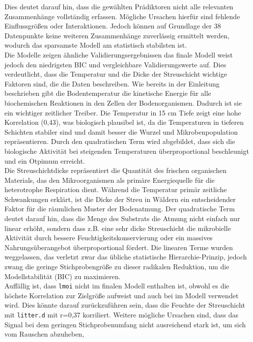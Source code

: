 Dies deutet darauf hin, dass die gewählten Prädiktoren nicht alle relevanten Zusammenhänge vollständig erfassen. Mögliche Ursachen hierfür sind fehlende
Einflussgrößen oder Interaktionen. Jedoch können auf Grundlage der 38 Datenpunkte keine weiteren
Zusammenhänge zuverlässig ermittelt werden, wodurch das sparsamste Modell am statistisch stabilsten ist.
\\
Die Modelle zeigen ähnliche Validierungsergebnissen das finale Modell weist jedoch den
niedrigsten BIC und vergleichbare Validierungswerte auf. Dies verdeutlicht, dass die Temperatur und die Dicke der Streuschicht wichtige Faktoren sind, die die Daten beschreiben.
Wie bereits in der Einleitung beschrieben gibt die Bodentemperatur die kinetische Energie für alle biochemischen Reaktionen in den Zellen der Bodenorganismen.
Dadurch ist sie ein wichtiger zeitlicher Treiber. Die Temperatur in 15 cm Tiefe zeigt eine hohe Korrelation (0,43),
was biologisch plausibel ist, da die Temperaturen in tieferen Schichten stabiler sind und damit besser die
Wurzel und Mikrobenpopulation repräsentieren. Durch den quadratischen Term wird abgebildet, dass sich die
biologische Aktivität bei steigenden Temperaturen überproportional beschleunigt und ein Otpimum erreicht.
\\
Die Streuschichtdicke repräsentiert die Quantität des frischen organischen
Materials, das den Mikroorganismen als primäre Energiequelle für die heterotrophe Respiration dient.
Während die Temperatur primär zeitliche Schwankungen erklärt, ist die Dicke der Streu in Wäldern ein
entscheidender Faktor für die räumlichen Muster der Bodenatmung. Der quadratische Term deutet darauf hin,
dass die Menge des Substrats die Atmung nicht einfach nur linear erhöht, sondern dass z.B. eine sehr
dicke Streuschicht die mikrobielle Aktivität durch bessere Feuchtigkeitskonservierung oder ein massives
Nahrungsüberangebot überproportional fördert. Die linearen Terme wurden weggelassen, das verletzt zwar
das übliche statistische Hierarchie-Prinzip, jedoch zwang die geringe Stichprobengröße zu dieser radikalen
Reduktion, um die Modellstabilität (BIC) zu maximieren.
\\
Auffällig ist, dass \texttt{lmoi} nicht im finalen Modell enthalten ist, obwohl es die höchste Korrelation zur Zielgröße 
aufweist und auch bei \cite{diss} im Modell verwendet wird.
Dies könnte darauf zurückzuführen sein, dass die Feuchte der
Streuschicht mit \texttt{litter.d} mit r=0,37 korriliert. 
Weitere mögliche Ursachen sind, dass das Signal bei dem geringen Stichprobenumfang nicht ausreichend stark ist, um sich vom Rauschen abzuheben, 
